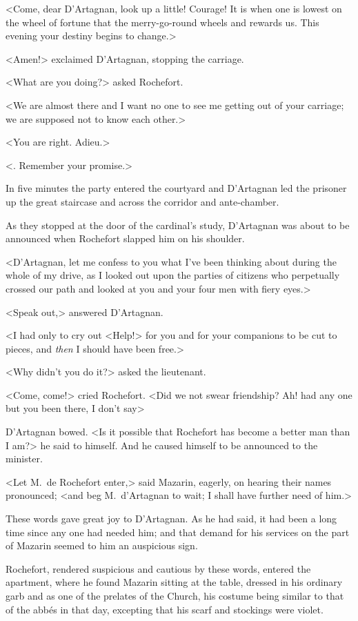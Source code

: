 <Come, dear D'Artagnan, look up a little! Courage! It is when one is lowest on the wheel of fortune that the merry-go-round wheels and rewards us. This evening your destiny begins to change.>

<Amen!> exclaimed D'Artagnan, stopping the carriage.

<What are you doing?> asked Rochefort.

<We are almost there and I want no one to see me getting out of your carriage; we are supposed not to know each other.>

<You are right. Adieu.>

<. Remember your promise.>

In five minutes the party entered the courtyard and D'Artagnan led the prisoner up the great staircase and across the corridor and ante-chamber.

As they stopped at the door of the cardinal's study, D'Artagnan was about to be announced when Rochefort slapped him on his shoulder.

<D'Artagnan, let me confess to you what I've been thinking about during the whole of my drive, as I looked out upon the parties of citizens who perpetually crossed our path and looked at you and your four men with fiery eyes.>

<Speak out,> answered D'Artagnan.

<I had only to cry out <Help!> for you and for your companions to be cut to pieces, and \emph{then} I should have been free.>

<Why didn't you do it?> asked the lieutenant.

<Come, come!> cried Rochefort. <Did we not swear friendship? Ah! had any one but you been there, I don't say\longdash>

D'Artagnan bowed. <Is it possible that Rochefort has become a better man than I am?> he said to himself. And he caused himself to be announced to the minister.

<Let M.~de Rochefort enter,> said Mazarin, eagerly, on hearing their names pronounced; <and beg M.~d'Artagnan to wait; I shall have further need of him.>

These words gave great joy to D'Artagnan. As he had said, it had been a long time since any one had needed him; and that demand for his services on the part of Mazarin seemed to him an auspicious sign.

Rochefort, rendered suspicious and cautious by these words, entered the apartment, where he found Mazarin sitting at the table, dressed in his ordinary garb and as one of the prelates of the Church, his costume being similar to that of the abbés in that day, excepting that his scarf and stockings were violet.

